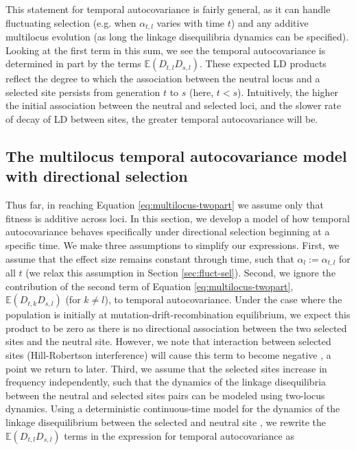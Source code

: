 \documentclass[11pt]{article}
\newcommand{\E}{\mathbb{E}}
\begin{document}
This statement for temporal autocovariance is fairly general, as it can handle
fluctuating selection (e.g. when $\alpha_{t,l}$ varies with time $t$) and any
additive multilocus evolution (as long the linkage disequilibria dynamics can
be specified). Looking at the first term in this sum, we see the temporal
autocovariance is determined in part by the terms $\E(D_{t,l} D_{s,l})$. These
expected LD products reflect the degree to which the association between the
neutral locus and a selected site persists from generation $t$ to $s$ (here, $t
< s$). Intuitively, the higher the initial association between the neutral and
selected loci, and the slower rate of decay of LD between sites, the greater
temporal autocovariance will be.

\subsection{The multilocus temporal autocovariance model with directional selection}
\label{sec:temp-autocov-dirsel}

Thus far, in reaching Equation \eqref{eq:multilocus-twopart} we assume only
that fitness is additive across loci. In this section, we develop a model of
how temporal autocovariance behaves specifically under directional selection
beginning at a specific time. We make three assumptions to simplify our
expressions. First, we assume that the effect size remains constant through
time, such that $\alpha_l := \alpha_{t,l}$ for all $t$ (we relax this
assumption in Section \ref{sec:fluct-sel}). Second, we ignore the contribution
of the second term of Equation \eqref{eq:multilocus-twopart}, $\E(D_{t,k}
D_{s,l})$ (for $k \ne l$), to temporal autocovariance. Under the case where the
population is initially at mutation-drift-recombination equilibrium, we expect
this product to be zero as there is no directional association between the two
selected sites and the neutral site. However, we note that interaction
  between selected sites (Hill-Robertson interference) will cause this term to
become negative \parencite{Barton2005-zq}, a point we return to later. Third,
we assume that the selected sites increase in frequency independently, such
that the dynamics of the linkage disequilibria between the neutral and selected
sites pairs can be modeled using two-locus dynamics. Using a deterministic
continuous-time model for the dynamics of the linkage disequilibrium between
the selected and neutral site \parencite{Maynard_Smith1974-lc,Barton2000-zg},
we rewrite the $\E(D_{t,l} D_{s,l})$ terms in the expression for temporal
autocovariance as
\end{document}
